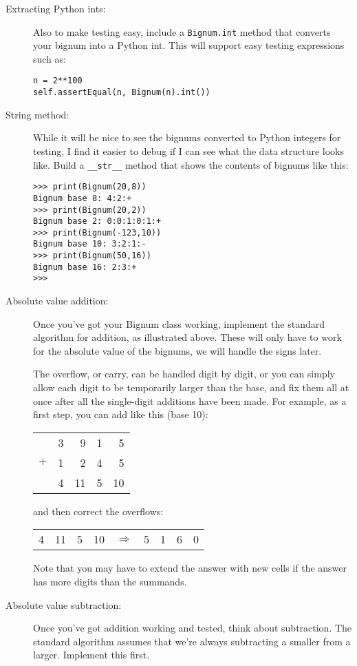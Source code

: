 \documentclass{article}
\begin{document}
\begin{description}
\item[Extracting Python ints:]
Also to make testing easy, include a \lstinline{Bignum.int} method that
converts your bignum into a Python int.  This will support easy testing
expressions such as:
\begin{lstlisting}
n = 2**100
self.assertEqual(n, Bignum(n).int())
\end{lstlisting}

\item[String method:]
While it will be nice to see the bignums converted to Python integers for 
testing, 
I find it easier to debug if I can see what the data structure looks like.
Build a \lstinline{__str__} method that shows the contents of bignums like this:
\begin{lstlisting}
>>> print(Bignum(20,8))
Bignum base 8: 4:2:+
>>> print(Bignum(20,2))
Bignum base 2: 0:0:1:0:1:+
>>> print(Bignum(-123,10))
Bignum base 10: 3:2:1:-
>>> print(Bignum(50,16))
Bignum base 16: 2:3:+
>>> 
\end{lstlisting}

\item[Absolute value addition:] 
Once you've got your Bignum class
working, 
implement the standard algorithm for addition, as illustrated
above.  These will only have to work for the absolute value of the bignums,
we will handle the signs later.  

The overflow, or carry, can be handled digit by digit, or you can simply
allow each digit to be temporarily larger than the base, and fix them all
at once after all the single-digit additions have been made.  For example,
as a first step, you can add like this (base 10):

\begin{tabular}{rrrrr}
  &3 &9 &1 &5\\
$+$ &1 &2 &4 &5\\
\hline
  &4 &11 &5 &10
\end{tabular}\hfill and then correct the overflows: \hfill
\begin{tabular}{rrrrcrrrr}
4 & 11 & 5 & 10 & $\Rightarrow$ &5 & 1 & 6 & 0
\end{tabular}

Note that you may have to extend the answer with new cells if the
answer has more digits than the summands.

\item[Absolute value subtraction:]  Once you've got addition working
and tested, think about subtraction.  The standard algorithm
assumes that we're always subtracting a smaller from a larger.
Implement this first.


\end{description}
\end{document}
